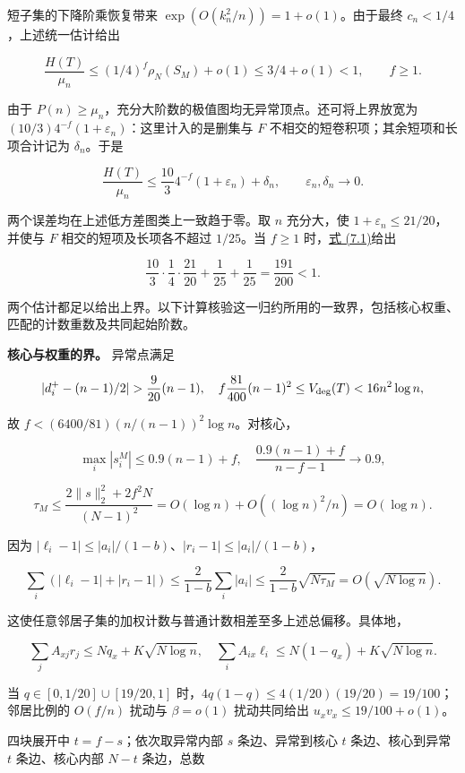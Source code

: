 \documentclass[11pt,a4paper]{article}
\begin{document}
短子集的下降阶乘恢复带来 \(\exp(O(k_n^2/n))=1+o(1)\)。由于最终 \(c_n<1/4\)，上述统一估计给出

\[
\frac{H(T)}{\mu_n}
\le(1/4)^f\rho_N(S_M)+o(1)
\le 3/4+o(1)<1,\qquad f\ge1.
\]

由于 \(P(n)\ge\mu_n\)，充分大阶数的极值图均无异常顶点。还可将上界放宽为 \((10/3)4^{-f}(1+\varepsilon_n)\)：这里计入的是删集与 \(F\) 不相交的短卷积项；其余短项和长项合计记为 \(\delta_n\)。于是

\begin{equation}
\frac{H(T)}{\mu_n}\le\frac{10}{3}4^{-f}(1+\varepsilon_n)+\delta_n,
\qquad \varepsilon_n,\delta_n\longrightarrow0.
\tag{7.1}
\label{eq-exceptional-bound}
\end{equation}

两个误差均在上述低方差图类上一致趋于零。取 \(n\) 充分大，使 \(1+\varepsilon_n\le21/20\)，并使与 \(F\) 相交的短项及长项各不超过 \(1/25\)。当 \(f\ge1\) 时，\hyperref[eq-exceptional-bound]{式 (7.1)}给出

\[
\frac{10}{3}\cdot\frac14\cdot\frac{21}{20}+\frac1{25}+\frac1{25}
=\frac{191}{200}<1.
\]

两个估计都足以给出上界。以下计算核验这一归约所用的一致界，包括核心权重、匹配的计数重数及共同起始阶数。

\textbf{核心与权重的界。} 异常点满足

\[
|d_i^+-(n-1)/2|>\frac9{20}(n-1),\quad
f\frac{81}{400}(n-1)^2\le V_{\rm deg}(T)<16n^2\log n,
\]

故 \(f<(6400/81)(n/(n-1))^2\log n\)。对核心，

\[
\max_i|s_i^M|\le0.9(n-1)+f,
\quad \frac{0.9(n-1)+f}{n-f-1}\longrightarrow0.9,
\]

\[
\tau_M\le\frac{2\|s\|_2^2+2f^2N}{(N-1)^2}
=O(\log n)+O((\log n)^2/n)=O(\log n).
\]

因为 \(|\ell_i-1|\le|a_i|/(1-b)\)、\(|r_i-1|\le|a_i|/(1-b)\)，

\[
\sum_i(|\ell_i-1|+|r_i-1|)
\le\frac2{1-b}\sum_i|a_i|
\le\frac2{1-b}\sqrt{N\tau_M}=O(\sqrt{N\log n}).
\]

这使任意邻居子集的加权计数与普通计数相差至多上述总偏移。具体地，

\[
\sum_jA_{xj}r_j\le Nq_x+K\sqrt{N\log n},\quad
\sum_iA_{ix}\ell_i\le N(1-q_x)+K\sqrt{N\log n}.
\]

当 \(q\in[0,1/20]\cup[19/20,1]\) 时，\(4q(1-q)\le4(1/20)(19/20)=19/100\)；邻居比例的 \(O(f/n)\) 扰动与 \(\beta=o(1)\) 扰动共同给出 \(u_xv_x\le19/100+o(1)\)。

四块展开中 \(t=f-s\)；依次取异常内部 \(s\) 条边、异常到核心 \(t\) 条边、核心到异常 \(t\) 条边、核心内部 \(N-t\) 条边，总数
\end{document}
